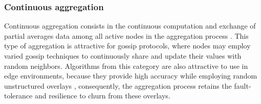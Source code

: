 \subsubsection*{Continuous aggregation}

Continuous aggregation consists in the continuous computation and exchange of partial averages data among all active nodes in the aggregation process  \cite{8613952}. This type of aggregation is attractive for gossip protocols, where nodes may employ varied gossip techniques to continuously share and update their values with random neighbors. Algorithms from this category are also attractive to use in edge environments, because they provide high accuracy while employing random unstructured overlays \cite{gossip_aggregation}, consequently, the aggregation process retains the fault-tolerance and resilience to churn from these overlays.






